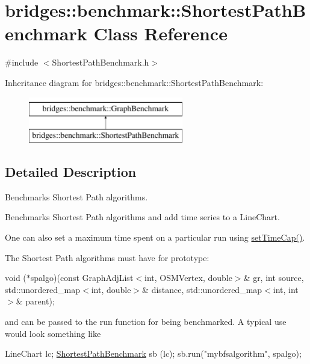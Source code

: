 \hypertarget{classbridges_1_1benchmark_1_1_shortest_path_benchmark}{}\section{bridges\+:\+:benchmark\+:\+:Shortest\+Path\+Benchmark Class Reference}
\label{classbridges_1_1benchmark_1_1_shortest_path_benchmark}


{\ttfamily \#include $<$Shortest\+Path\+Benchmark.\+h$>$}

Inheritance diagram for bridges\+:\+:benchmark\+:\+:Shortest\+Path\+Benchmark\+:\begin{figure}[H]
\begin{center}
\leavevmode
\includegraphics[height=2.000000cm]{classbridges_1_1benchmark_1_1_shortest_path_benchmark}
\end{center}
\end{figure}


\subsection{Detailed Description}
Benchmarks Shortest Path algorithms. 

Benchmarks Shortest Path algorithms and add time series to a Line\+Chart.

One can also set a maximum time spent on a particular run using \hyperlink{classbridges_1_1benchmark_1_1_graph_benchmark_a56934eb2789e54c088e7b4423c3a7456}{set\+Time\+Cap()}.

The Shortest Path algorithms must have for prototype\+:

void ($\ast$spalgo)(const Graph\+Adj\+List$<$int, O\+S\+M\+Vertex, double$>$\& gr, int source, std\+::unordered\+\_\+map$<$int, double$>$\& distance, std\+::unordered\+\_\+map$<$int, int$>$\& parent);

and can be passed to the run function for being benchmarked. A typical use would look something like


\begin{DoxyCode}
LineChart lc;
\hyperlink{classbridges_1_1benchmark_1_1_shortest_path_benchmark_aa7109739d2ac254c113d820cff747df4}{ShortestPathBenchmark} sb (lc);
sb.run(\textcolor{stringliteral}{"mybfsalgorithm"}, spalgo);
\end{DoxyCode}


